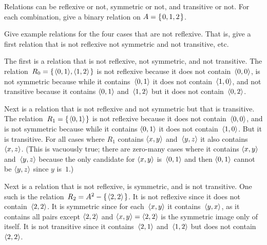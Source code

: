 \documentclass{ibl}  %
\begin{document}
\begin{problem} 
Relations can be reflexive or not, 
symmetric or not, and transitive or not.
For each combination, give a binary relation on $A=\mbox{$\{\hspace{0.1em}0,1,2\hspace{0.1em}\}$}$.
\begin{exes}
\begin{exercise}
  Give example relations for the four cases
  that are not reflexive. 
  That is, give a first relation that is not reflexive
  not symmetric and not transitive, etc.     
\end{exercise}
\begin{answer}
  The first is a relation that is not reflexive, not symmetric, and
  not transitive.
  The relation~$R_0=\mbox{$\{\hspace{0.1em}\langle0,1\rangle,\langle1,2\rangle\hspace{0.1em}\}$}$
  is not reflexive because it does not contain~$\langle0,0\rangle$, 
  is not symmetric because while it contains~$\langle0,1\rangle$
  it does not contain~$\langle1,0\rangle$, and not transitive
  because it contains $\langle0,1\rangle$ and~$\langle1,2\rangle$
  but it does not contain~$\langle0,2\rangle$.

  Next is a relation that is not reflexive and not symmetric but that is
  transitive.
  The relation~$R_1=\mbox{$\{\hspace{0.1em}\langle0,1\rangle\hspace{0.1em}\}$}$
  is not reflexive because it does not contain~$\langle0,0\rangle$,
  and is not symmetric because while it contains $\langle0,1\rangle$ it does not
  contain~$\langle1,0\rangle$.
  But it is transitive.
  For all cases where $R_1$ contains $\langle x,y\rangle$ and~$\langle y,z\rangle$
  it also contains~$\langle x,z\rangle$. 
  (This is vacuously true; there are zero-many cases
  where it contains $\langle x,y\rangle$ and~$\langle y,z\rangle$
  because the only candidate for $\langle x,y\rangle$ is~$\langle0,1\rangle$
  and then $\langle0,1\rangle$ cannot be $\langle y,z\rangle$ since $y$ is~$1$.)

  Next is a relation that is not reflexive, is symmetric, and is 
  not transitive.
  One such is the relation~$R_2=A^2-\mbox{$\{\hspace{0.1em}\langle2,2\rangle\hspace{0.1em}\}$}$.
  It is not reflexive since it does not contain~$\langle2,2\rangle$.
  It is symmetric since for each~$\langle x,y\rangle$ it contains~$\langle y,x\rangle$,
  as it contains all pairs except $\langle2,2\rangle$ and  
  $\langle x,y\rangle=\langle2,2\rangle$ is the symmetric image only of itself.
  It is not transitive since it contains~$\langle2,1\rangle$ and~$\langle1,2\rangle$
  but does not contain~$\langle2,2\rangle$.


\end{answer}
\end{exes}
\end{problem}
\end{document}
